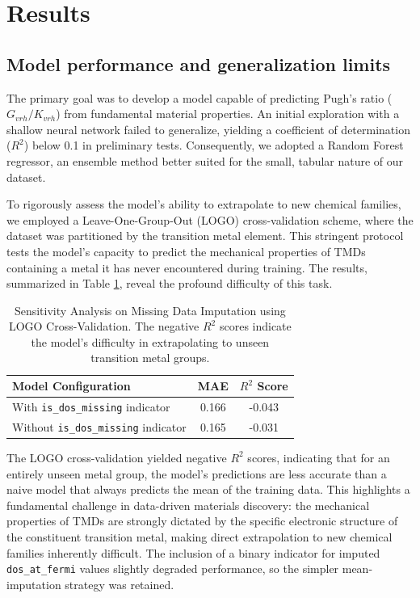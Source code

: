 \documentclass[]{article}
\begin{document}
\section{Results}
\label{sec:results}
\subsection{Model performance and generalization limits}

The primary goal was to develop a model capable of predicting Pugh's ratio ($G_{vrh}/K_{vrh}$) from fundamental material properties. An initial exploration with a shallow neural network failed to generalize, yielding a coefficient of determination ($R^2$) below 0.1 in preliminary tests. Consequently, we adopted a Random Forest regressor, an ensemble method better suited for the small, tabular nature of our dataset.

To rigorously assess the model's ability to extrapolate to new chemical families, we employed a Leave-One-Group-Out (LOGO) cross-validation scheme, where the dataset was partitioned by the transition metal element. This stringent protocol tests the model's capacity to predict the mechanical properties of TMDs containing a metal it has never encountered during training. The results, summarized in Table \ref{tab:logo_cv}, reveal the profound difficulty of this task.

\begin{table}[h!]
\centering
\caption{Sensitivity Analysis on Missing Data Imputation using LOGO Cross-Validation. The negative $R^2$ scores indicate the model's difficulty in extrapolating to unseen transition metal groups.}
\label{tab:logo_cv}
\begin{tabular}{lcc}
\hline
\hline
Model Configuration & MAE & $R^2$ Score \\
\hline
With \texttt{is\_dos\_missing} indicator & 0.166 & -0.043 \\
Without \texttt{is\_dos\_missing} indicator & 0.165 & -0.031 \\
\hline
\end{tabular}
\end{table}

The LOGO cross-validation yielded negative $R^2$ scores, indicating that for an entirely unseen metal group, the model's predictions are less accurate than a naive model that always predicts the mean of the training data. This highlights a fundamental challenge in data-driven materials discovery: the mechanical properties of TMDs are strongly dictated by the specific electronic structure of the constituent transition metal, making direct extrapolation to new chemical families inherently difficult. The inclusion of a binary indicator for imputed \texttt{dos\_at\_fermi} values slightly degraded performance, so the simpler mean-imputation strategy was retained.
\end{document}
